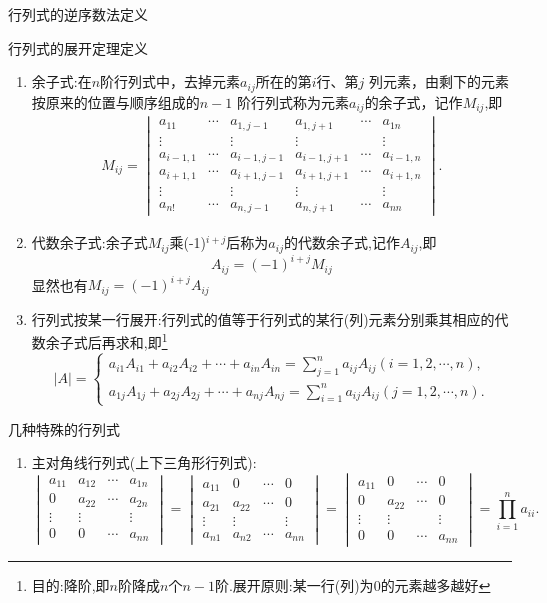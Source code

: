 \documentclass[8pt a4paper, oneside, UTF8]{ctexbook}
\begin{document}
\begin{sloppypar}
\begin{defn}{行列式的逆序数法定义}{}
    \end{defn}
    \begin{defn}{行列式的展开定理定义}{}
        \begin{enumerate}
            \item 余子式:在$n$阶行列式中，去掉元素$a_{ij}$所在的第$i$行、第$j$ 列元素，由剩下的元素按原来的位置与顺序组成的$n-1$ 阶行列式称为元素$a_{ij}$的余子式，记作$M_{ij}$,即$$\begin{gathered}M_{ij}=\begin{vmatrix}a_{11}&\cdots&a_{1,j-1}&a_{1,j+1}&\cdots&a_{1n}\\\vdots&&\vdots&\vdots&&\vdots\\a_{i-1,1}&\cdots&a_{i-1,j-1}&a_{i-1,j+1}&\cdots&a_{i-1,n}\\a_{i+1,1}&\cdots&a_{i+1,j-1}&a_{i+1,j+1}&\cdots&a_{i+1,n}\\\vdots&&\vdots&\vdots&&\vdots\\a_{n!}&\cdots&a_{n,j-1}&a_{n,j+1}&\cdots&a_{nn}\end{vmatrix}.\end{gathered}$$
            \item 代数余子式:余子式$M_{ij}$乘(-1)$^{i+j}$后称为$a_{ij}$的代数余子式,记作$A_{ij}$,即$$A_{ij}=(-1)^{i+j}M_{ij}$$显然也有$M_{ij}=(-1)^{i+j}A_{ij}$
            \item 行列式按某一行展开:行列式的值等于行列式的某行(列)元素分别乘其相应的代数余子式后再求和,即\footnote{目的:降阶,即$n$阶降成$n$个$n-1$阶.展开原则:某一行(列)为$0$的元素越多越好}
            $$
                |A|=\begin{cases}a_{i1}A_{i1}+a_{i2}A_{i2}+\cdots+a_{in}A_{in}=\sum_{j=1}^{n}a_{ij}A_{ij}\left(i=1,2,\cdots,n\right),\\a_{1j}A_{1j}+a_{2j}A_{2j}+\cdots+a_{nj}A_{nj}=\sum_{i=1}^{n}a_{ij}A_{ij}\left(j=1,2,\cdots,n\right).\end{cases}
            $$
        \end{enumerate}
    \end{defn}
    \begin{criterion}{几种特殊的行列式}{}
        \begin{enumerate}
            \item 主对角线行列式(上下三角形行列式):$$\begin{vmatrix}a_{11}&a_{12}&\cdots&a_{1n}\\0&a_{22}&\cdots&a_{2n}\\\vdots&\vdots&&\vdots\\0&0&\cdots&a_{nn}\end{vmatrix}=\begin{vmatrix}a_{11}&0&\cdots&0\\a_{21}&a_{22}&\cdots&0\\\vdots&\vdots&&\vdots\\a_{n1}&a_{n2}&\cdots&a_{nn}\end{vmatrix}=\begin{vmatrix}a_{11}&0&\cdots&0\\0&a_{22}&\cdots&0\\\vdots&\vdots&&\vdots\\0&0&\cdots&a_{nn}\end{vmatrix}=\prod_{i=1}^na_{ii} .$$

\end{enumerate}
\end{criterion}
\end{sloppypar}
\end{document}
